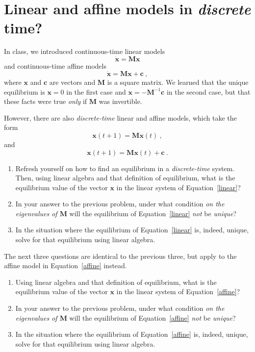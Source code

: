 \documentclass[11pt,onecolumn,superscriptaddress,notitlepage]{article}
\newcommand{\vx}[0]{\mathbf{x}}
\begin{document}
\clearpage
\section*{Linear and affine models in {\it discrete} time?} 
In class, we introduced continuous-time linear models 
$$\dot{\vx} = \mathbf{M}\vx$$
 and continuous-time affine models 
$$\dot{\vx} = \mathbf{M}\vx + \mathbf{c}\ ,$$
 where $\vx$ and $\mathbf{c}$ are vectors and $\mathbf{M}$ is a square matrix. We learned that the unique equilibrium is $\vx=0$ in the first case and $\vx=-\mathbf{M}^{-1} \mathbf{c}$ in the second case, but that these facts were true {\it only} if $\mathbf{M}$ was invertible. 
 
 
 However, there are also {\it discrete-time} linear and affine models, which take the form
 \begin{equation}
	 \vx(t+1) = \mathbf{M} \vx(t)\ ,
	 \label{linear}
 \end{equation}
and 
\begin{equation}
	\vx(t+1) = \mathbf{M} \vx(t) + \mathbf{c}\ .
	\label{affine}
\end{equation}

\vspace{0.2in}
\begin{enumerate}[resume]
	\item Refresh yourself on how to find an equilibrium in a {\it discrete-time} system. Then, using linear algebra and that definition of equilibrium, what is the equilibrium value of the vector $\mathbf{x}$ in the linear system of Equation~\eqref{linear}?
	\item In your answer to the previous problem, under what condition {\it on the eigenvalues of $\mathbf{M}$} will the equilibrium of Equation~\eqref{linear} {\it not} be {\it unique}?
	\item In the situation where the equilibrium of Equation~\eqref{linear} is, indeed, unique, solve for that equilibrium using linear algebra.
\end{enumerate}

\vspace{0.2in}
The next three questions are identical to the previous three, but apply to the affine model in Equation~\eqref{affine} instead. 
\begin{enumerate}[resume]
	\item Using linear algebra and that definition of equilibrium, what is the equilibrium value of the vector $\mathbf{x}$ in the linear system of Equation~\eqref{affine}?
	\item In your answer to the previous problem, under what condition {\it on the eigenvalues of $\mathbf{M}$} will the equilibrium of Equation~\eqref{affine} {\it not} be {\it unique}?
	\item In the situation where the equilibrium of Equation~\eqref{affine} is, indeed, unique, solve for that equilibrium using linear algebra.
\end{enumerate}
\end{document}
